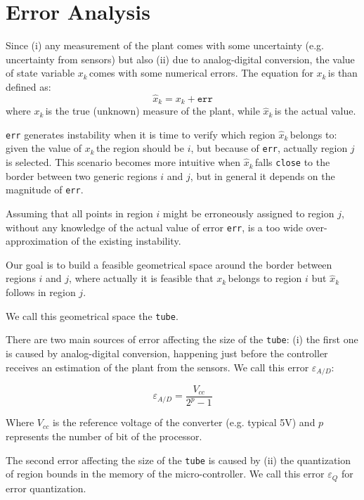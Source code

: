 \documentclass[sigconf]{acmart}
\newcommand{\statevar}{x_{k}}
\newcommand{\statevarmath}{$x_{k}\,$}
\newcommand{\qstatevar}{\hat{x}_{k}}
\newcommand{\qstatevarmath}{$\hat{x}_{k}\,$}
\begin{document}
\section{Error Analysis}
Since (i) any measurement of the plant comes with some uncertainty (e.g. uncertainty from sensors) but also (ii) due to analog-digital conversion, the value of state variable \statevarmath comes with some numerical errors. The equation for \statevarmath is than defined as:
\begin{equation}
\qstatevar=\statevar + \texttt{err}
\end{equation}
where \statevarmath is the true (unknown) measure of the plant, while \qstatevarmath is the actual value.

\texttt{err} generates instability when it is time to verify which region \qstatevarmath belongs to: given the value of \statevarmath the region should be $i$, but because of \texttt{err}, actually region $j$ is selected. This scenario becomes more intuitive when \qstatevarmath falls \texttt{close} to the border between two generic regions $i$ and $j$, but in general it depends on the magnitude of \texttt{err}.

Assuming that all points in region $i$ might be erroneously assigned to region $j$, without any  knowledge of the actual value of error \texttt{err}, is a too wide over-approximation of the existing instability. 

Our goal is to build a feasible geometrical space around the border between regions $i$ and $j$, where actually it is feasible that \statevarmath belongs to region $i$ but \qstatevarmath follows in region $j$.

We call this geometrical space the \texttt{tube}.

There are two main sources of error affecting the size of the \texttt{tube}: (i) the first one is caused by analog-digital conversion, happening just before the controller receives an estimation of the plant from the sensors. We call this error $\varepsilon_{A/D}$: 

\begin{equation}\nonumber
\varepsilon_{A/D}=\frac{V_{cc}}{2^{p}-1}
\end{equation}

Where $V_{cc}$ is the reference voltage of the converter (e.g. typical 5V) and $p$ represents the number of bit of the processor.

The second error affecting the size of the \texttt{tube} is caused by (ii) the quantization of region bounds in the memory of the micro-controller. We call this error $\varepsilon_{Q}$ for error quantization.
\end{document}
